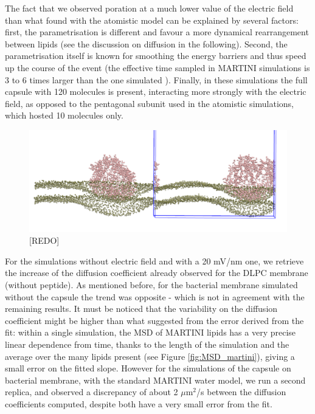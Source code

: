 The fact that we observed poration at a much lower value of the electric field than what found with the atomistic model can be explained by several factors: first, the parametrisation is different and favour a more dynamical rearrangement between lipids (see the discussion on diffusion in the following). Second, the parametrisation itself is known for smoothing the energy barriers and thus speed up the course of the event (the effective time sampled in MARTINI simulations is 3 to 6 times larger than the one simulated \citep{SiewertJ.Marrink2003}). Finally, in these simulations the full capsule with 120 molecules is present, interacting more strongly with the electric field, as opposed to the pentagonal subunit used in the atomistic simulations, which hosted 10 molecules only.

\begin{figure}[t!]
\centering\includegraphics[width=0.95\linewidth]{3results_capsule/pics/picmartiniPW.png} 
\caption[MARTINI simulations of capsule on membrane]{[REDO]}
\label{fig:martini_stMem}
\end{figure}

For the simulations without electric field and with a 20 mV/nm one, we retrieve the increase of the diffusion coefficient already observed for the DLPC membrane (without peptide). As mentioned before, for the bacterial membrane simulated without the capsule the trend was opposite - which is not in agreement with the remaining results.
%
It must be noticed that the variability on the diffusion coefficient might be higher than what suggested from the error derived from the fit: within a single simulation, the MSD of MARTINI lipids has a very precise linear dependence from time, thanks to the length of the simulation and the average over the many lipids present (see Figure \ref{fig:MSD_martini}), giving a small error on the fitted slope. However for the simulations of the capsule on bacterial membrane, with the standard MARTINI water model, we run a second replica, and observed a discrepancy of about 2 $\mu$m$^2$/s between the diffusion coefficients computed, despite both have a very small error from the fit.

